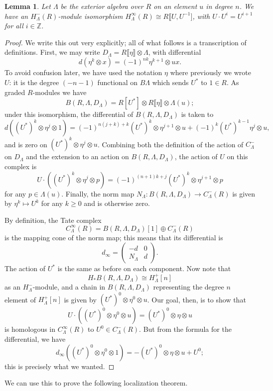 \documentclass{memo-l}
\newtheorem{lemma}[theorem]{Lemma}
\theoremstyle{definition}
\theoremstyle{remark}
\numberwithin{section}{chapter}
\numberwithin{equation}{chapter}
\begin{document}
\begin{lemma}\label{PeriodicComputation}Let $\Lambda$ be the exterior algebra over $R$ on an element $u$ in degree $n$. We have an $H^-_\Lambda(R)$-module isomorphism $H^\infty_\Lambda(R) \cong R \llbracket U, U^{-1}]$, with $U \cdot U^i = U^{i+1}$ for all $i \in \mathbb Z$.
\end{lemma}
\begin{proof}We write this out very explicitly; all of what follows is a transcription of definitions. First, we may write $D_\Lambda = R\llbracket \eta\rrbracket \otimes \Lambda$, with differential 
$$d(\eta^k \otimes x) = (-1)^{nk} \eta^{k+1} \otimes ux.$$ 
To avoid confusion later, we have used the notation $\eta$ where previously we wrote $U$: it is the degree $(-n-1)$ functional on $B\Lambda$ which sends $U^*$ to $1 \in R$. As graded $R$-modules we have
$$B(R, \Lambda, D_\Lambda) = R[U^*] \otimes R\llbracket \eta\rrbracket \otimes \Lambda(u);$$ 
under this isomorphism, the differential of $B(R, \Lambda, D_\Lambda)$ is taken to
$$d((U^*)^k \otimes \eta^j \otimes 1) = (-1)^{n(j+k)+k}(U^*)^k \otimes \eta^{j+1} \otimes u + (-1)^k (U^*)^{k-1} \eta^j \otimes u,$$ and is zero on $(U^*)^k \otimes \eta^j \otimes u$. Combining both the definition of the action of $C_\Lambda^-$ on $D_\Lambda$ and the extension to an action on $B(R, \Lambda, D_\Lambda)$, the action of $U$ on this complex is 
$$U \cdot ((U^*)^k \otimes \eta^j \otimes p) = (-1)^{(n+1)k+j} (U^*)^k \otimes \eta^{j+1} \otimes p$$ for any $p \in \Lambda(u)$. Finally, the norm map $N_\Lambda: B(R, \Lambda, D_\Lambda) \to C^-_\Lambda(R)$ is given by $\eta^k \mapsto U^k$ for any $k \geq 0$ and is otherwise zero.

By definition, the Tate complex $$C^\infty_\Lambda(R) = B(R, \Lambda, D_\Lambda)[1] \oplus C^-_\Lambda(R)$$ is the mapping cone of the norm map; this means that its differential is 
$$d_\infty = \begin{pmatrix}-d & 0\\N_\Lambda & d\end{pmatrix}.$$ 
The action of $U^*$ is the same as before on each component. Now note that 
$$H_* B(R, \Lambda, D_\Lambda) \cong H^+_\Lambda[n]$$ 
as an $H^-_\Lambda$-module, and a chain in $B(R, \Lambda, D_\Lambda)$ representing the degree $n$ element of $H^+_\Lambda[n]$ is given by $(U^*)^0 \otimes \eta^0 \otimes u$. Our goal, then, is to show that 
$$U \cdot ((U^*)^0 \otimes \eta^0 \otimes u) = (U^*)^0 \otimes \eta \otimes u$$ 
is homologous in $C^\infty_\Lambda(R)$ to $U^0 \in C^-_\Lambda(R)$. But from the formula for the differential, we have 
$$d_\infty((U^*)^0 \otimes \eta^0 \otimes 1) = -(U^*)^0 \otimes \eta \otimes u + U^0;$$ this is precisely what we wanted.
\end{proof}
We can use this to prove the following localization theorem.
\end{document}

